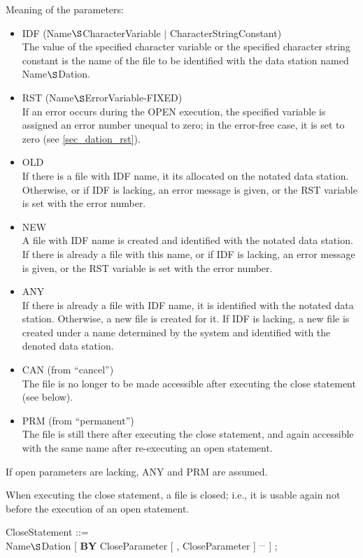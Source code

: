 Meaning of the parameters:
\begin{itemize}
\item IDF (Name$\S $CharacterVariable $\mid$ CharacterStringConstant)\\
The value of the specified character variable or the specified character
string constant is the name of the file to be identified with the data
station named Name$\S $Dation.
\item RST (Name$\S $ErrorVariable-FIXED)\\
If an error occurs during the OPEN execution, the specified variable is
assigned an error number unequal to zero; in the error-free case, it is
set to zero (see \ref{sec_dation_rst}).
\item OLD\\
If there is a file with IDF name, it its allocated on the notated data
station. Otherwise, or if IDF is lacking, an error message is given, or
the RST variable is set with the error number.
\item NEW\\
A file with IDF name is created and identified with the notated data
station. If there is already a file with this name, or if IDF is
lacking, an error message is given, or the RST variable is set with the
error number.
\item ANY\\
If there is already a file with IDF name, it is identified with the
notated data station. Otherwise, a new file is created for it. If IDF
is lacking, a new file is created under a name determined by the system
and identified with the denoted data station.
\item CAN (from ``cancel'')\\
The file is no longer to be made accessible after executing the close
statement (see below).
\item PRM (from ``permanent'')\\
The file is still there after executing the close statement, and again
accessible with the same name after re-executing an open statement.
\end{itemize}

If open parameters are lacking, ANY and PRM are assumed.

When executing the close statement, a file is closed; i.e., it is
usable again not before the execution of an open statement.

CloseStatement ::=\\
 Name$\S $Dation [ {\bf BY} CloseParameter [ , CloseParameter ] $^{...}$ ] ;

